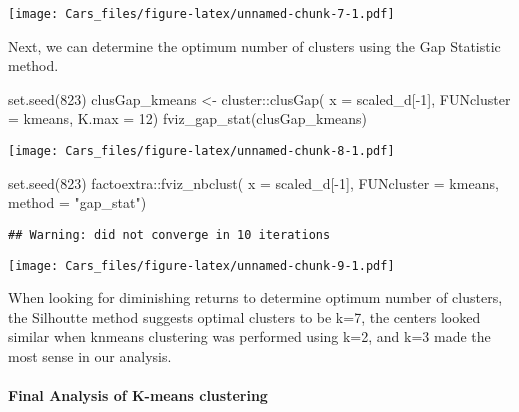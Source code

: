 \documentclass[
]{article}
\newenvironment{Shaded}{\begin{snugshade}}{\end{snugshade}}
\newcommand{\AttributeTok}[1]{\textcolor[rgb]{0.77,0.63,0.00}{#1}}
\newcommand{\DecValTok}[1]{\textcolor[rgb]{0.00,0.00,0.81}{#1}}
\newcommand{\FunctionTok}[1]{\textcolor[rgb]{0.00,0.00,0.00}{#1}}
\newcommand{\NormalTok}[1]{#1}
\newcommand{\OtherTok}[1]{\textcolor[rgb]{0.56,0.35,0.01}{#1}}
\newcommand{\SpecialCharTok}[1]{\textcolor[rgb]{0.00,0.00,0.00}{#1}}
\newcommand{\StringTok}[1]{\textcolor[rgb]{0.31,0.60,0.02}{#1}}
\begin{document}
\texttt{[image: Cars\_files/figure-latex/unnamed-chunk-7-1.pdf]}

Next, we can determine the optimum number of clusters using the Gap
Statistic method.

\begin{Shaded}
\begin{Highlighting}[]
\FunctionTok{set.seed}\NormalTok{(}\DecValTok{823}\NormalTok{)}
\NormalTok{clusGap\_kmeans }\OtherTok{\textless{}{-}}\NormalTok{ cluster}\SpecialCharTok{::}\FunctionTok{clusGap}\NormalTok{(}
  \AttributeTok{x =}\NormalTok{ scaled\_d[}\SpecialCharTok{{-}}\DecValTok{1}\NormalTok{],  }
  \AttributeTok{FUNcluster =}\NormalTok{ kmeans,  }
  \AttributeTok{K.max =} \DecValTok{12}\NormalTok{)}
\FunctionTok{fviz\_gap\_stat}\NormalTok{(clusGap\_kmeans)}
\end{Highlighting}
\end{Shaded}

\texttt{[image: Cars\_files/figure-latex/unnamed-chunk-8-1.pdf]}

\begin{Shaded}
\begin{Highlighting}[]
\FunctionTok{set.seed}\NormalTok{(}\DecValTok{823}\NormalTok{)}
\NormalTok{factoextra}\SpecialCharTok{::}\FunctionTok{fviz\_nbclust}\NormalTok{(  }
  \AttributeTok{x =}\NormalTok{ scaled\_d[}\SpecialCharTok{{-}}\DecValTok{1}\NormalTok{],  }
  \AttributeTok{FUNcluster =}\NormalTok{ kmeans,  }
  \AttributeTok{method =} \StringTok{"gap\_stat"}\NormalTok{)}
\end{Highlighting}
\end{Shaded}

\begin{verbatim}
## Warning: did not converge in 10 iterations
\end{verbatim}

\texttt{[image: Cars\_files/figure-latex/unnamed-chunk-9-1.pdf]}

When looking for diminishing returns to determine optimum number of
clusters, the Silhoutte method suggests optimal clusters to be k=7, the
centers looked similar when knmeans clustering was performed using k=2,
and k=3 made the most sense in our analysis.

\hypertarget{final-analysis-of-k-means-clustering}{%
\paragraph{Final Analysis of K-means
clustering}\label{final-analysis-of-k-means-clustering}}
\end{document}
